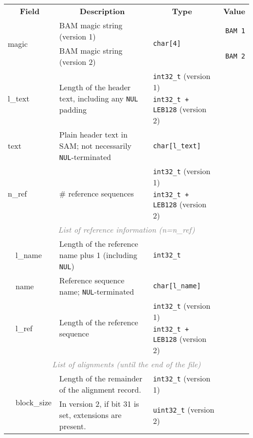 \documentclass[10pt]{article}
\begin{document}
\begin{table}[!ht]
\centering
{\small
\begin{tabular}{|l|l|l|p{8.15cm}|l|r|}
  \cline{1-6}
  \multicolumn{3}{|c|}{\bf Field} & \multicolumn{1}{c|}{\bf Description} & \multicolumn{1}{c|}{\bf Type\footnotemark\ } & \multicolumn{1}{c|}{\bf Value} \\\cline{1-6}
  \multicolumn{3}{|l|}{\multirow{2}{*}{\sf magic}} & BAM magic string (version 1) & \multirow{2}{*}{\tt char[4]} & {\tt BAM\char92 1}\\
  \multicolumn{3}{|l|}{} & BAM magic string (version 2) & & {\tt BAM\char92 2}\\\cline{1-6}
  \multicolumn{3}{|l|}{\multirow{2}{*}{\sf l\_text}} & \multirow{2}{*}{Length of the header text, including any {\tt NUL} padding} & {\tt int32\_t} (version 1) & \\
  \multicolumn{3}{|l|}{} & & {\tt int32\_t + LEB128} (version 2) & \\\cline{1-6}
  \multicolumn{3}{|l|}{\sf text} & Plain header text in SAM; not necessarily {\tt NUL}-terminated & {\tt char[{\sf l\_text}]} & \\\cline{1-6}
  \multicolumn{3}{|l|}{\multirow{2}{*}{\sf n\_ref}} & \multirow{2}{*}{\# reference sequences} & {\tt int32\_t} (version 1) & \\
  \multicolumn{3}{|l|}{} &  & {\tt int32\_t + LEB128} (version 2) & \\\cline{1-6}
  \multicolumn{6}{|c|}{\textcolor{gray}{\it List of reference information (n=n\_ref)}} \\\cline{2-6}
  & \multicolumn{2}{l|}{\sf l\_name} & Length of the reference name plus 1 (including {\tt NUL}) & {\tt int32\_t} & \\\cline{2-6}
  & \multicolumn{2}{l|}{\sf name} & Reference sequence name; {\tt NUL}-terminated & {\tt char[{\sf l\_name}]} & \\\cline{2-6}
  & \multicolumn{2}{l|}{\multirow{2}{*}{\sf l\_ref}} & \multirow{2}{*}{Length of the reference sequence} & {\tt int32\_t} (version 1) & \\
  & \multicolumn{2}{l|}{} & & {\tt int32\_t + LEB128} (version 2) & \\\cline{1-6}
  \multicolumn{6}{|c|}{\textcolor{gray}{\it List of alignments (until the end of the file)}} \\\cline{2-6}
  & \multicolumn{2}{l|}{\multirow{2}{*}{\sf block\_size}} & Length of the remainder of the alignment record. & {\tt int32\_t} (version 1) & \\
  & \multicolumn{2}{l|}{} & In version 2, if bit 31 is set, extensions are present. & {\tt uint32\_t} (version 2) & \\\cline{2-6}

\end{tabular}}
\end{table}
\end{document}
